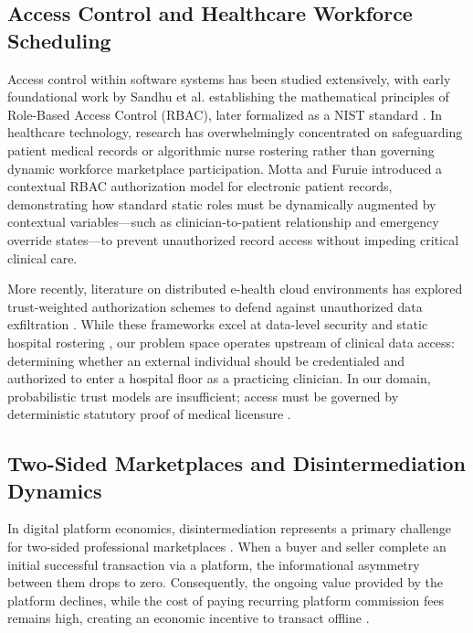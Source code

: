 \documentclass[conference]{IEEEtran}
\begin{document}
\subsection{Access Control and Healthcare Workforce Scheduling}
Access control within software systems has been studied extensively, with early foundational work by Sandhu et al. \cite{sandhu1996role} establishing the mathematical principles of Role-Based Access Control (RBAC), later formalized as a NIST standard \cite{ferraiolo2001proposed}. In healthcare technology, research has overwhelmingly concentrated on safeguarding patient medical records or algorithmic nurse rostering \cite{burke2004state} rather than governing dynamic workforce marketplace participation. Motta and Furuie \cite{motta2003contextual} introduced a contextual RBAC authorization model for electronic patient records, demonstrating how standard static roles must be dynamically augmented by contextual variables---such as clinician-to-patient relationship and emergency override states---to prevent unauthorized record access without impeding critical clinical care.

More recently, literature on distributed e-health cloud environments has explored trust-weighted authorization schemes to defend against unauthorized data exfiltration \cite{supabase2023rls}. While these frameworks excel at data-level security and static hospital rostering \cite{burke2004state}, our problem space operates upstream of clinical data access: determining whether an external individual should be credentialed and authorized to enter a hospital floor as a practicing clinician. In our domain, probabilistic trust models are insufficient; access must be governed by deterministic statutory proof of medical licensure \cite{nmc2023act, sandhu1996role}.

\subsection{Two-Sided Marketplaces and Disintermediation Dynamics}
In digital platform economics, disintermediation represents a primary challenge for two-sided professional marketplaces \cite{rochet2006two, hagiu2015multi}. When a buyer and seller complete an initial successful transaction via a platform, the informational asymmetry between them drops to zero. Consequently, the ongoing value provided by the platform declines, while the cost of paying recurring platform commission fees remains high, creating an economic incentive to transact offline \cite{gu2021trust}.
\end{document}
